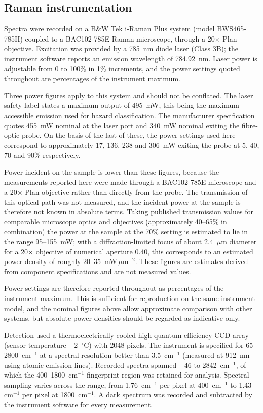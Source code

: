 \documentclass[11pt,a4paper]{article}
\newcommand{\wn}{\ensuremath{\mathrm{cm}^{-1}}}
\begin{document}
\subsection{Raman instrumentation}

Spectra were recorded on a B\&W Tek i-Raman Plus system (model BWS465-785H)
coupled to a BAC102-785E Raman microscope, through a 20$\times$ Plan objective.
Excitation was provided by a 785~nm diode laser (Class 3B); the instrument
software reports an emission wavelength of 784.92~nm. Laser power is adjustable
from 0 to 100\% in 1\% increments, and the power settings quoted throughout are
percentages of the instrument maximum.

Three power figures apply to this system and should not be conflated. The laser
safety label states a maximum output of 495~mW, this being the maximum accessible
emission used for hazard classification. The manufacturer specification quotes
455~mW nominal at the laser port and 340~mW nominal exiting the fibre-optic
probe. On the basis of the last of these, the power settings used here correspond
to approximately 17, 136, 238 and 306~mW exiting the probe at 5, 40, 70 and 90\%
respectively.

Power incident on the sample is lower than these figures, because the
measurements reported here were made through a BAC102-785E microscope and a
20$\times$ Plan objective rather than directly from the probe. The transmission
of this optical path was not measured, and the incident power at the sample is
therefore not known in absolute terms. Taking published transmission values for
comparable microscope optics and objectives (approximately 40--65\% in
combination) the power at the sample at the 70\% setting is estimated to lie in
the range 95--155~mW; with a diffraction-limited focus of about 2.4~$\mu$m
diameter for a 20$\times$ objective of numerical aperture 0.40, this corresponds
to an estimated power density of roughly 20--35~mW\,$\mu$m$^{-2}$. These figures
are estimates derived from component specifications and are not measured values.

Power settings are therefore reported throughout as percentages of the instrument
maximum. This is sufficient for reproduction on the same instrument model, and
the nominal figures above allow approximate comparison with other systems, but
absolute power densities should be regarded as indicative only.

Detection used a thermoelectrically cooled high-quantum-efficiency CCD array
(sensor temperature $-2$~$^{\circ}$C) with 2048 pixels. The instrument is
specified for 65--2800~\wn{} at a spectral resolution better than 3.5~\wn{}
(measured at 912~nm using atomic emission lines). Recorded spectra spanned
$-46$ to 2842~\wn{}, of which the 400--1800~\wn{} fingerprint region was
retained for analysis. Spectral sampling varies across the range, from
1.76~\wn{} per pixel at 400~\wn{} to 1.43~\wn{} per pixel at 1800~\wn{}. A dark
spectrum was recorded and subtracted by the instrument software for every
measurement.
\end{document}
